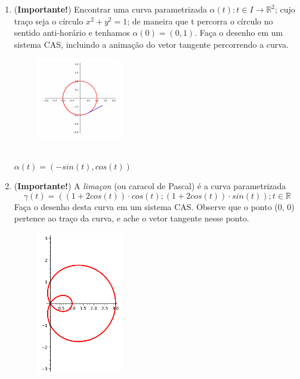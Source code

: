 \documentclass{article}
\begin{document}
\begin{enumerate}
\begin{enumerate}[label=1.\arabic*.]
        \end{enumerate}
    \item (\textbf{Importante!}) Encontrar uma curva parametrizada $\alpha(t) : t \in I \to \mathbb{R}^2$; cujo traço seja o círculo $x^2 + y^2 = 1$; de maneira que t percorra o círculo no sentido anti-horário e tenhamos $\alpha(0) = (0, 1)$. Faça o desenho em um sistema CAS, incluindo a animação do vetor tangente percorrendo a curva. \\    
        \begin{figure}[!h]
            \centering
            \includegraphics[width=0.35\textwidth]{imgs/curva_vector.png}
            \label{fig:exercício 2}
        \end{figure}
        \\ $\alpha(t) = (-sin(t), cos(t))$
    \item (\textbf{Importante!}) A \textit{limaçon} (ou caracol de Pascal) é a curva parametrizada \
        $$\gamma(t) = ((1+2cos(t)) \cdot cos(t); (1+2cos(t)) \cdot sin(t)); t \in \mathbb{R}$$
        Faça o desenho desta curva em um sistema CAS. Observe que o ponto (0, 0) pertence ao traço da curva, e ache o vetor tangente nesse ponto. \
        \begin{figure}[!h]
            \centering
            \includegraphics[width=0.35\textwidth]{imgs/limacon.png}
            \label{fig:exercício 3}

\end{figure}
\end{enumerate}
\end{document}
